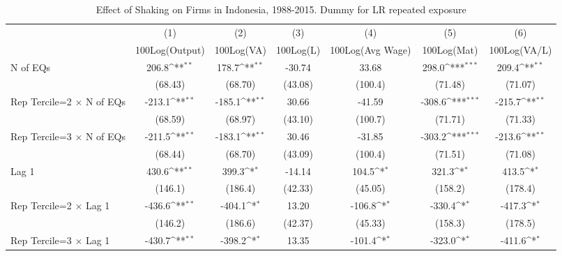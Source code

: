 \begin{table}[htbp]\centering
\def\sym#1{\ifmmode^{#1}\else\(^{#1}\)\fi}
\caption{Effect of Shaking on Firms in Indonesia, 1988-2015. Dummy for LR repeated exposure}
\begin{tabular}{l*{6}{c}}
\toprule
                &\multicolumn{1}{c}{(1)}&\multicolumn{1}{c}{(2)}&\multicolumn{1}{c}{(3)}&\multicolumn{1}{c}{(4)}&\multicolumn{1}{c}{(5)}&\multicolumn{1}{c}{(6)}\\
                &\multicolumn{1}{c}{100Log(Output)}&\multicolumn{1}{c}{100Log(VA)}&\multicolumn{1}{c}{100Log(L)}&\multicolumn{1}{c}{100Log(Avg Wage)}&\multicolumn{1}{c}{100Log(Mat)}&\multicolumn{1}{c}{100Log(VA/L)}\\
\midrule
N of EQs        &    206.8\sym{**} &    178.7\sym{**} &   -30.74         &    33.68         &    298.0\sym{***}&    209.4\sym{**} \\
                &  (68.43)         &  (68.70)         &  (43.08)         &  (100.4)         &  (71.48)         &  (71.07)         \\
\addlinespace
Rep Tercile=2 $\times$ N of EQs&   -213.1\sym{**} &   -185.1\sym{**} &    30.66         &   -41.59         &   -308.6\sym{***}&   -215.7\sym{**} \\
                &  (68.59)         &  (68.97)         &  (43.10)         &  (100.7)         &  (71.71)         &  (71.33)         \\
\addlinespace
Rep Tercile=3 $\times$ N of EQs&   -211.5\sym{**} &   -183.1\sym{**} &    30.46         &   -31.85         &   -303.2\sym{***}&   -213.6\sym{**} \\
                &  (68.44)         &  (68.70)         &  (43.09)         &  (100.4)         &  (71.51)         &  (71.08)         \\
\addlinespace
Lag 1           &    430.6\sym{**} &    399.3\sym{*}  &   -14.14         &    104.5\sym{*}  &    321.3\sym{*}  &    413.5\sym{*}  \\
                &  (146.1)         &  (186.4)         &  (42.33)         &  (45.05)         &  (158.2)         &  (178.4)         \\
\addlinespace
Rep Tercile=2 $\times$ Lag 1&   -436.6\sym{**} &   -404.1\sym{*}  &    13.20         &   -106.8\sym{*}  &   -330.4\sym{*}  &   -417.3\sym{*}  \\
                &  (146.2)         &  (186.6)         &  (42.37)         &  (45.33)         &  (158.3)         &  (178.5)         \\
\addlinespace
Rep Tercile=3 $\times$ Lag 1&   -430.7\sym{**} &   -398.2\sym{*}  &    13.35         &   -101.4\sym{*}  &   -323.0\sym{*}  &   -411.6\sym{*}  \\

\end{tabular}
\end{table}
